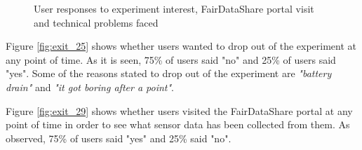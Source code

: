 \begin{figure}[htp]
\hspace{1em}
\newline
\centering
{}
\caption{User responses to experiment interest, FairDataShare portal visit and technical problems faced}
\label{fig:st3}
\end{figure}

Figure \ref{fig:exit_25} shows whether users wanted to drop out of the experiment at any point of time. As it is seen, 75\% of users said "no" and 25\% of users said "yes". Some of the reasons stated to drop out of the experiment are \textit{"battery drain"} and \textit{"it got boring after a point"}.

Figure \ref{fig:exit_29} shows whether users visited the FairDataShare portal at any point of time in order to see what sensor data has been collected from them. As observed, 75\% of users said "yes" and 25\% said "no".

